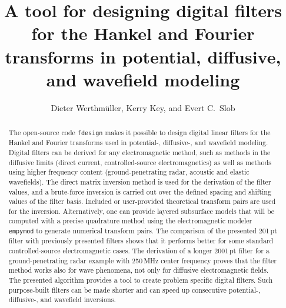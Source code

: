 \documentclass[paper,twocolumn,twoside]{geophysics}
\begin{document}
\title{A tool for designing digital filters for the Hankel and Fourier
transforms in potential, diffusive, and wavefield modeling}

\renewcommand{\thefootnote}{\fnsymbol{footnote}}


\address{
\footnotemark[1]Instituto Mexicano del Petróleo,
Eje Central Lázaro Cárdenas Norte 152,
Col. San Bartolo Atepehuacan C.P. 07730,
Ciudad de México, México,
E-mail: \href{mailto:dieter@werthmuller.org}{Dieter@Werthmuller.org};
\footnotemark[2]Lamont-Doherty Earth Observatory, Columbia University,
305C Oceanography,
61 Route 9W, PO Box 1000,
Palisades NY 10964-8000 US,
E-mail: \href{mailto:KKey@ldeo.columbia.edu}{KKey@ldeo.columbia.edu};
\footnotemark[3]TU Delft,
Building 23,
Stevinweg 1 / PO-box 5048,
2628 CN Delft,
E-mail: \href{mailto:E.C.Slob@tudelft.nl}{E.C.Slob@tudelft.nl}.}


\author{%
Dieter Werthmüller\footnotemark[1], %
Kerry Key\footnotemark[2], and %
Evert C.\ Slob\footnotemark[3]%
}

\footer{}

\maketitle

\begin{abstract} %
%
  The open-source code \texttt{fdesign} makes it possible to design digital
  linear filters for the Hankel and Fourier transforms used in potential-,
  diffusive-, and wavefield modeling. Digital filters can be derived for any
  electromagnetic method, such as methods in the diffusive limits (direct
  current, controlled-source electromagnetics) as well as methods using higher
  frequency content (ground-penetrating radar, acoustic and elastic wavefields).
%
  The direct matrix inversion method is used for the derivation of the filter
  values, and a brute-force inversion is carried out over the defined spacing
  and shifting values of the filter basis. Included or user-provided
  theoretical transform pairs are used for the inversion. Alternatively, one
  can provide layered subsurface models that will be computed with a precise
  quadrature method using the electromagnetic modeler \texttt{empymod} to
  generate numerical transform pairs.
%
  The comparison of the presented 201\,pt filter with previously presented
  filters shows that it performs better for some standard controlled-source
  electromagnetic cases. The derivation of a longer 2001\,pt filter for a
  ground-penetrating radar example with 250\,MHz center frequency proves that
  the filter method works also for wave phenomena, not only for diffusive
  electromagnetic fields.
%
  The presented algorithm provides a tool to create problem specific digital
  filters. Such purpose-built filters can be made shorter and can speed up
  consecutive  potential-, diffusive-, and wavefield inversions.
%
\end{abstract}
\end{document}
